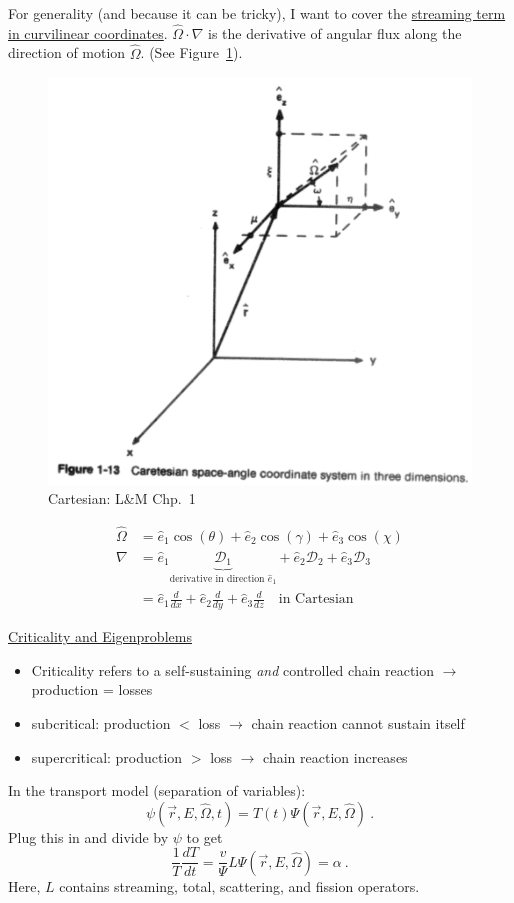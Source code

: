\documentclass[12pt]{article}
\newcommand{\rvec}{\ensuremath{\vec{r}}}
\newcommand{\vOmega}{\ensuremath{\hat{\Omega}}}
\begin{document}
For generality (and because it can be tricky), I want to cover the \underline{streaming term in curvilinear coordinates}.
$\vOmega \cdot \nabla$ is the derivative of angular flux along the direction of motion $\vOmega$. (See Figure~\ref{fig:cart-coord}).
%
\begin{figure}[h!]
    \begin{center}
    \includegraphics[keepaspectratio, width = 4 in]{../figs/cartesian-coords}
    \end{center}   
    \caption{Cartesian: L\&M Chp.\ 1}
    \label{fig:cart-coord}
\end{figure}
%
\begin{align*}
\vOmega &= \hat{e}_1 \cos(\theta) + \hat{e}_2 \cos(\gamma) + \hat{e}_3 \cos(\chi) \\
\nabla &= \hat{e}_1 \underbrace{\mathcal{D}_1}_{\text{derivative in direction }\hat{e}_1} + \hat{e}_2 \mathcal{D}_2 + \hat{e}_3 \mathcal{D}_3\\
&= \hat{e}_1 \frac{d}{dx} + \hat{e}_2 \frac{d}{dy} + \hat{e}_3 \frac{d}{dz} \quad \text{in Cartesian}
\end{align*}

\underline{Criticality and Eigenproblems}
\begin{itemize}
\item Criticality refers to a self-sustaining \textit{and} controlled chain reaction $\rightarrow$ production = losses
\item subcritical: production $<$ loss $\rightarrow$ chain reaction cannot sustain itself
\item supercritical: production $>$ loss $\rightarrow$ chain reaction increases 
\end{itemize}
%
In the transport model (separation of variables):
\[\psi(\rvec, E, \vOmega, t) = T(t) \Psi(\rvec, E, \vOmega) \:.\]
Plug this in and divide by $\psi$ to get
\[\frac{1}{T}\frac{dT}{dt} = \frac{v}{\Psi} L \Psi(\rvec, E, \vOmega) = \alpha \:.\]
%
Here, $L$ contains streaming, total, scattering, and fission operators.
\end{document}
